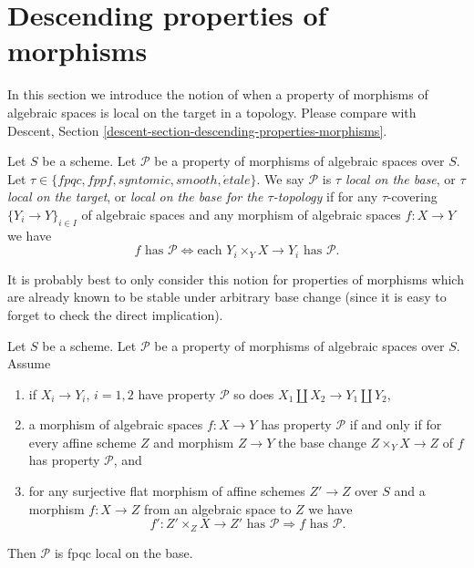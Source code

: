 \section{Descending properties of morphisms}
\label{section-descending-properties-morphisms}

\noindent
In this section we introduce the notion of when a property of morphisms of
algebraic spaces is local on the target in a topology. Please compare with
Descent, Section \ref{descent-section-descending-properties-morphisms}.

\begin{definition}
\label{definition-property-morphisms-local}
Let $S$ be a scheme.
Let $\mathcal{P}$ be a property of morphisms of algebraic spaces over $S$.
Let $\tau \in \{fpqc, fppf, syntomic, smooth, \acute{e}tale\}$.
We say $\mathcal{P}$ is {\it $\tau$ local on the base}, or
{\it $\tau$ local on the target}, or
{\it local on the base for the $\tau$-topology} if for any
$\tau$-covering $\{Y_i \to Y\}_{i \in I}$ of algebraic spaces
and any morphism of algebraic spaces $f : X \to Y$ we 
have
$$
f \text{ has }\mathcal{P}
\Leftrightarrow
\text{each }Y_i \times_Y X \to Y_i\text{ has }\mathcal{P}.
$$
\end{definition}

\noindent
It is probably best to only consider this notion for properties of morphisms
which are already known to be stable under arbitrary base change (since it is
easy to forget to check the direct implication).

\begin{lemma}
\label{lemma-descending-properties-morphisms}
Let $S$ be a scheme. Let $\mathcal{P}$ be a property of morphisms of
algebraic spaces over $S$. Assume
\begin{enumerate}
\item if $X_i \to Y_i$, $i = 1, 2$ have property $\mathcal{P}$ so
does $X_1 \amalg X_2 \to Y_1 \amalg Y_2$,
\item a morphism of algebraic spaces $f : X \to Y$ has property
$\mathcal{P}$ if and only if for every affine scheme $Z$ and
morphism $Z \to Y$ the base change $Z \times_Y X \to Z$ of $f$
has property $\mathcal{P}$, and
\item for any surjective flat morphism of affine schemes
$Z' \to Z$ over $S$ and a morphism $f : X \to Z$ from an algebraic space
to $Z$ we have
$$
f' : Z' \times_Z X \to Z'\text{ has }\mathcal{P}
\Rightarrow
f\text{ has }\mathcal{P}.
$$
\end{enumerate}
Then $\mathcal{P}$ is fpqc local on the base.
\end{lemma}

